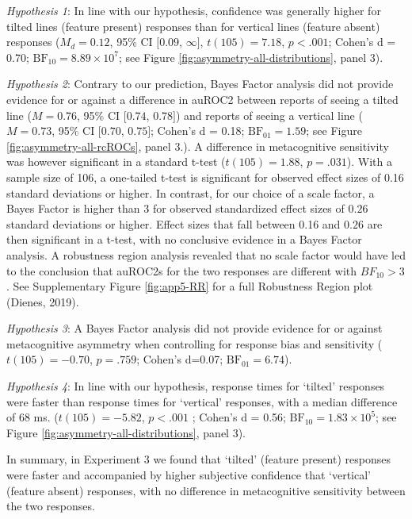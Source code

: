 \documentclass[12pt,twoside]{reedthesis}
\begin{document}
\emph{Hypothesis 1}: In line with our hypothesis, confidence was generally higher for tilted lines (feature present) responses than for vertical lines (feature absent) responses (\(M_d = 0.12\), 95\% CI \([0.09\), \(\infty]\), \(t(105) = 7.18\), \(p < .001\); Cohen's d = 0.70; \(\mathrm{BF}_{\textrm{10}} = 8.89 \times 10^{7}\); see Figure \ref{fig:asymmetry-all-distributions}, panel 3).

\emph{Hypothesis 2}: Contrary to our prediction, Bayes Factor analysis did not provide evidence for or against a difference in auROC2 between reports of seeing a tilted line (\(M = 0.76\), 95\% CI \([0.74\), \(0.78]\)) and reports of seeing a vertical line (\(M = 0.73\), 95\% CI \([0.70\), \(0.75]\); Cohen's d = 0.18; \(\mathrm{BF}_{\textrm{01}} = 1.59\); see Figure \ref{fig:asymmetry-all-rcROCs}, panel 3.). A difference in metacognitive sensitivity was however significant in a standard t-test (\(t(105) = 1.88\), \(p = .031\)). With a sample size of 106, a one-tailed t-test is significant for observed effect sizes of 0.16 standard deviations or higher. In contrast, for our choice of a scale factor, a Bayes Factor is higher than 3 for observed standardized effect sizes of \(0.26\) standard deviations or higher. Effect sizes that fall between 0.16 and \(0.26\) are then significant in a t-test, with no conclusive evidence in a Bayes Factor analysis. A robustness region analysis revealed that no scale factor would have led to the conclusion that auROC2s for the two responses are different with \(BF_{10}>3\). See Supplementary Figure \ref{fig:app5-RR} for a full Robustness Region plot (Dienes, 2019).

\emph{Hypothesis 3}: A Bayes Factor analysis did not provide evidence for or against metacognitive asymmetry when controlling for response bias and sensitivity (\(t(105) = -0.70\), \(p = .759\); Cohen's d=0.07; \(\mathrm{BF}_{\textrm{01}} = 6.74\)).

\emph{Hypothesis 4}: In line with our hypothesis, response times for `tilted' responses were faster than response times for `vertical' responses, with a median difference of 68 ms. (\(t(105) = -5.82\), \(p < .001\) ; Cohen's d = 0.56; \(\mathrm{BF}_{\textrm{10}} = 1.83 \times 10^{5}\); see Figure \ref{fig:asymmetry-all-distributions}, panel 3).

In summary, in Experiment 3 we found that `tilted' (feature present) responses were faster and accompanied by higher subjective confidence that `vertical' (feature absent) responses, with no difference in metacognitive sensitivity between the two responses.
\end{document}
